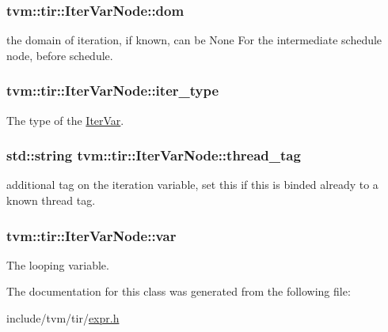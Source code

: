 \subsubsection[{\texorpdfstring{dom}{dom}}]{ tvm\+::tir\+::\+Iter\+Var\+Node\+::dom}\hypertarget{classtvm_1_1tir_1_1IterVarNode_acd6ca5f580e556a2d022e47900f9fe71}{}\label{classtvm_1_1tir_1_1IterVarNode_acd6ca5f580e556a2d022e47900f9fe71}


the domain of iteration, if known, can be None For the intermediate schedule node, before schedule. 

\subsubsection[{\texorpdfstring{iter\+\_\+type}{iter_type}}]{ tvm\+::tir\+::\+Iter\+Var\+Node\+::iter\+\_\+type}\hypertarget{classtvm_1_1tir_1_1IterVarNode_af733200a8afd687584ffb8a52fb6a533}{}\label{classtvm_1_1tir_1_1IterVarNode_af733200a8afd687584ffb8a52fb6a533}


The type of the \hyperlink{classtvm_1_1tir_1_1IterVar}{Iter\+Var}. 

\subsubsection[{\texorpdfstring{thread\+\_\+tag}{thread_tag}}]{\setlength{\rightskip}{0pt plus 5cm}std\+::string tvm\+::tir\+::\+Iter\+Var\+Node\+::thread\+\_\+tag}\hypertarget{classtvm_1_1tir_1_1IterVarNode_a5557fabe09e48331422c89385cf45966}{}\label{classtvm_1_1tir_1_1IterVarNode_a5557fabe09e48331422c89385cf45966}


additional tag on the iteration variable, set this if this is binded already to a known thread tag. 

\subsubsection[{\texorpdfstring{var}{var}}]{ tvm\+::tir\+::\+Iter\+Var\+Node\+::var}\hypertarget{classtvm_1_1tir_1_1IterVarNode_a09036ef2df09e7caf21e66dcb62675a6}{}\label{classtvm_1_1tir_1_1IterVarNode_a09036ef2df09e7caf21e66dcb62675a6}


The looping variable. 



The documentation for this class was generated from the following file\+:\begin{DoxyCompactItemize}
\item 
include/tvm/tir/\hyperlink{tir_2expr_8h}{expr.\+h}\end{DoxyCompactItemize}
